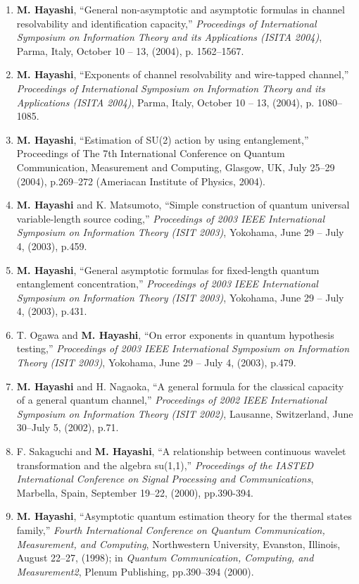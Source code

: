 \documentclass[a4paper,12pt,oneside]{article}
\begin{document}
\begin{enumerate}
\item
\textbf{M. Hayashi}, ``General non-asymptotic and asymptotic formulas in channel resolvability and identification capacity,'' 
{\em Proceedings of International Symposium on Information Theory and its Applications (ISITA 2004)}, Parma, Italy, October 10 -- 13, (2004), p. 1562--1567.

\item
\textbf{M. Hayashi}, ``Exponents of channel resolvability and wire-tapped channel,'' 
{\em Proceedings of International Symposium on Information Theory and its Applications (ISITA 2004)}, Parma, Italy, October 10 -- 13, (2004), p. 1080--1085.

\item
\textbf{M. Hayashi},
``Estimation of SU(2) action by using entanglement,'' 
Proceedings of The 7th International Conference on Quantum Communication, Measurement and Computing, Glasgow, UK, July 25--29 (2004), p.269--272 (Ameriacan Institute of Physics, 2004).

\item
\textbf{M. Hayashi} and K. Matsumoto, ``Simple construction of quantum universal variable-length source coding,'' 
{\em Proceedings of 2003 IEEE International Symposium on Information Theory (ISIT 2003)}, 
Yokohama, June 29 -- July 4, (2003), p.459.

\item
\textbf{M. Hayashi}, ``General asymptotic formulas for fixed-length quantum entanglement concentration,'' 
{\em Proceedings of 2003 IEEE International Symposium on Information Theory (ISIT 2003)}, 
Yokohama, June 29 -- July 4, (2003), p.431.

\item
T. Ogawa and \textbf{M. Hayashi}, ``On error exponents in quantum hypothesis testing,'' 
{\em Proceedings of 2003 IEEE International Symposium on Information Theory (ISIT 2003)}, 
Yokohama, June 29 -- July 4, (2003), p.479.

\item
\textbf{M. Hayashi} and H. Nagaoka, ``A general formula for the classical capacity of a general quantum channel,'' 
{\em Proceedings of 2002 IEEE International Symposium on Information Theory (ISIT 2002)}, 
Lausanne, Switzerland, June 30--July 5, (2002), p.71.

\item
F. Sakaguchi and \textbf{M. Hayashi}, ``A relationship between continuous wavelet transformation and the algebra su(1,1),'' 
{\em Proceedings of the IASTED International Conference on Signal Processing and Communications}, Marbella, Spain, September 19--22, (2000), pp.390-394.
\item
\textbf{M. Hayashi}, ``Asymptotic quantum estimation theory for the thermal states family,'' 
{\em Fourth International Conference on 
Quantum Communication, Measurement, and Computing}, 
Northwestern University, Evanston, Illinois,  August 22--27, (1998);
in {\em Quantum Communication, Computing, and Measurement2}, Plenum Publishing, pp.390--394 (2000).


\end{enumerate}
\end{document}
